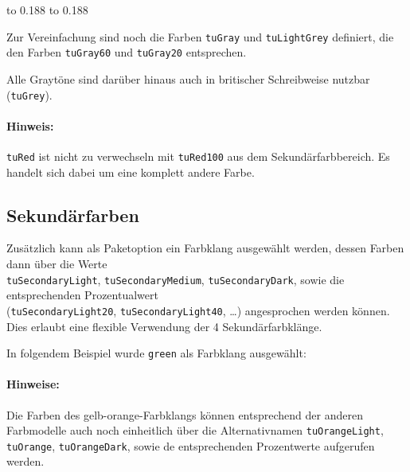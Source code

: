 {\sffamily\footnotesize%
\colorbox{tuRed}{\hbox to 0.188}%
\colorbox{tuBlack}{\hbox to 0.188}%
\\%
}


Zur Vereinfachung sind noch die Farben \lstinline{tuGray} und
\lstinline{tuLightGrey} definiert, die den Farben \lstinline{tuGray60} und
\lstinline{tuGray20} entsprechen.

Alle Graytöne sind darüber hinaus auch in britischer Schreibweise nutzbar
(\lstinline{tuGrey}).

\paragraph{Hinweis:}
\lstinline{tuRed} ist nicht zu verwechseln mit \lstinline{tuRed100} aus dem
Sekundärfarbbereich. Es handelt sich dabei um eine komplett andere Farbe.

\pagebreak
\subsection{Sekundärfarben}





Zusätzlich kann als Paketoption ein Farbklang ausgewählt werden, dessen Farben
dann über die Werte  \\\lstinline{tuSecondaryLight},
\lstinline{tuSecondaryMedium}, \lstinline{tuSecondaryDark}, sowie die
entsprechenden Prozentualwert \\(\lstinline{tuSecondaryLight20},
\lstinline{tuSecondaryLight40}, \ldots) angesprochen werden können.
Dies erlaubt eine flexible Verwendung der 4 Sekundärfarbklänge.

In folgendem Beispiel wurde \lstinline{green} als Farbklang ausgewählt:


\paragraph{Hinweise:}
Die Farben des gelb-orange-Farbklangs können entsprechend der anderen
Farbmodelle auch noch einheitlich über die Alternativnamen
\lstinline{tuOrangeLight}, \lstinline{tuOrange},
\lstinline{tuOrangeDark}, sowie de entsprechenden Prozentwerte aufgerufen
werden.


